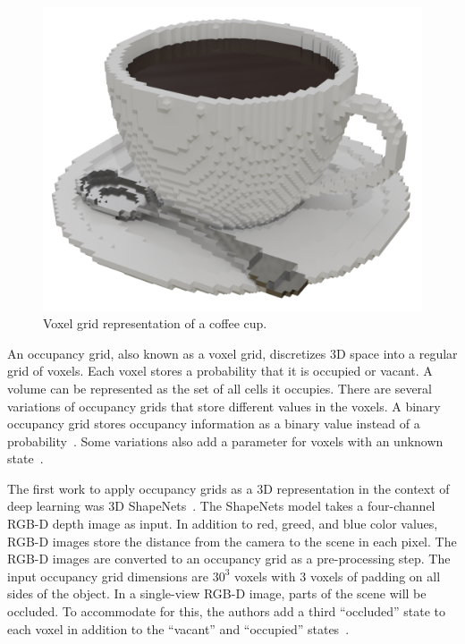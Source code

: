\begin{figure}[ht]
	\centering
	\includegraphics[scale=0.2]{Images/Voxel Cup}
	\caption{Voxel grid representation of a coffee cup.}
	\label{fig:voxel_cup}
\end{figure}

An occupancy grid, also known as a voxel grid, discretizes 3D space into a regular grid of voxels. Each voxel stores a probability that it is occupied or vacant. A volume can be represented as the set of all cells it occupies. There are several variations of occupancy grids that store different values in the voxels. A binary occupancy grid stores occupancy information as a binary value instead of a probability~\cite{Konolige1997}. Some variations also add a parameter for voxels with an unknown state~\cite{Ahmed2018}.

The first work to apply occupancy grids as a 3D representation in the context of deep learning was 3D ShapeNets~\cite{Wu2015}. The ShapeNets model takes a four-channel RGB-D depth image as input. In addition to red, greed, and blue color values, RGB-D images store the distance from the camera to the scene in each pixel. The RGB-D images are converted to an occupancy grid as a pre-processing step. The input occupancy grid dimensions are $30^3$ voxels with 3 voxels of padding on all sides of the object. In a single-view RGB-D image, parts of the scene will be occluded. To accommodate for this, the authors add a third ``occluded'' state to each voxel in addition to the ``vacant'' and ``occupied'' states~\cite{Wu2015}.

